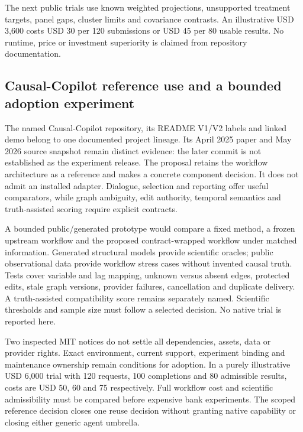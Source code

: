 The next public trials use known weighted projections, unsupported
treatment targets, panel gaps, cluster limits and covariance contrasts.
An illustrative USD 3,600 costs USD 30 per 120 submissions or USD 45 per
80 usable results. No runtime, price or investment superiority is
claimed from repository documentation. \citep{exec25_panelcxx_reference}

\hypertarget{causal-copilot-reference-use-and-a-bounded-adoption-experiment}{%
\subsection{Causal-Copilot reference use and a bounded adoption
experiment}\label{causal-copilot-reference-use-and-a-bounded-adoption-experiment}}

The named Causal-Copilot repository, its README V1/V2 labels and linked
demo belong to one documented project lineage. Its April 2025 paper and
May 2026 source snapshot remain distinct evidence: the later commit is
not established as the experiment release. The proposal retains the
workflow architecture as a reference and makes a concrete component
decision. It does not admit an installed adapter. Dialogue, selection
and reporting offer useful comparators, while graph ambiguity, edit
authority, temporal semantics and truth-assisted scoring require
explicit contracts.
\citep{exec17_copilot_paper,exec17_copilot_code,exec25_copilot_choice}

A bounded public/generated prototype would compare a fixed method, a
frozen upstream workflow and the proposed contract-wrapped workflow
under matched information. Generated structural models provide
scientific oracles; public observational data provide workflow stress
cases without invented causal truth. Tests cover variable and lag
mapping, unknown versus absent edges, protected edits, stale graph
versions, provider failures, cancellation and duplicate delivery. A
truth-assisted compatibility score remains separately named. Scientific
thresholds and sample size must follow a selected decision. No native
trial is reported here.
\citep{exec17_copilot_exact,exec25_copilot_choice}

Two inspected MIT notices do not settle all dependencies, assets, data
or provider rights. Exact environment, current support, experiment
binding and maintenance ownership remain conditions for adoption. In a
purely illustrative USD 6,000 trial with 120 requests, 100 completions
and 80 admissible results, costs are USD 50, 60 and 75 respectively.
Full workflow cost and scientific admissibility must be compared before
expensive bank experiments. The scoped reference decision closes one
reuse decision without granting native capability or closing either
generic agent umbrella.
\citep{exec17_copilot_rights,exec25_copilot_choice}

